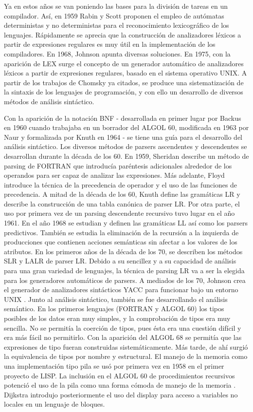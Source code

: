 Ya en estos años se van poniendo las bases para la división de tareas en un compilador. Así, en 1959 Rabin y Scott proponen el empleo de autómatas deterministas y no deterministas para el reconocimiento lexicográfico de los lenguajes. Rápidamente se aprecia que la construcción de analizadores léxicos a partir de expresiones regulares es muy útil en la implementación de los compiladores. En 1968, Johnson apunta diversas soluciones. En 1975, con la aparición de LEX surge el concepto de un generador automático de analizadores léxicos a partir de expresiones regulares, basado en el sistema operativo UNIX.
A partir de los trabajos de Chomsky ya citados, se produce una sistematización de la sintaxis de los lenguajes de programación, y con ello un desarrollo de diversos métodos de análisis sintáctico.

Con la aparición de la notación BNF - desarrollada en primer lugar por Backus en 1960 cuando trabajaba en un borrador del ALGOL 60, modificada en 1963 por Naur y formalizada por Knuth en 1964 - se tiene una guía para el desarrollo del análisis sintáctico. Los diversos métodos de parsers ascendentes y descendentes se desarrollan durante la década de los 60. En 1959, Sheridan describe un método de parsing de FORTRAN que introducía paréntesis adicionales alrededor de los operandos para ser capaz de analizar las expresiones. Más adelante, Floyd introduce la técnica de la precedencia de operador y el uso de las funciones de precedencia. A mitad de la década de los 60, Knuth define las gramáticas LR y describe la construcción de una tabla canónica de parser LR. Por otra parte, el uso por primera vez de un parsing descendente recursivo tuvo lugar en el año 1961. En el año 1968 se estudian y definen las gramáticas LL así como los parsers predictivos. También se estudia la eliminación de la recursión a la izquierda de producciones que contienen acciones semánticas sin afectar a los valores de los atributos.
En los primeros años de la década de los 70, se describen los métodos SLR y LALR de parser LR. Debido a su sencillez y a su capacidad de análisis para una gran variedad de lenguajes, la técnica de parsing LR va a ser la elegida para los generadores automáticos de parsers. A mediados de los 70, Johnson crea el generador de analizadores sintácticos YACC para funcionar bajo un entorno UNIX . Junto al análisis sintáctico, también se fue desarrollando el análisis semántico.
En los primeros lenguajes (FORTRAN y ALGOL 60) los tipos posibles de los datos eran muy simples, y la comprobación de tipos era muy sencilla. No se permitía la coerción de tipos, pues ésta era una cuestión difícil y era más fácil no permitirlo. Con la aparición del ALGOL 68 se permitía que las expresiones de tipo fueran construidas sistemáticamente. Más tarde, de ahí surgió la equivalencia de tipos por nombre y estructural. El manejo de la memoria como una implementación tipo pila se usó por primera vez en 1958 en el primer proyecto de LISP. La inclusión en el ALGOL 60 de procedimientos recursivos potenció el uso de la pila como una forma cómoda de manejo de la memoria . Dijkstra introdujo posteriormente el uso del display para acceso a variables no locales en un lenguaje de bloques.
